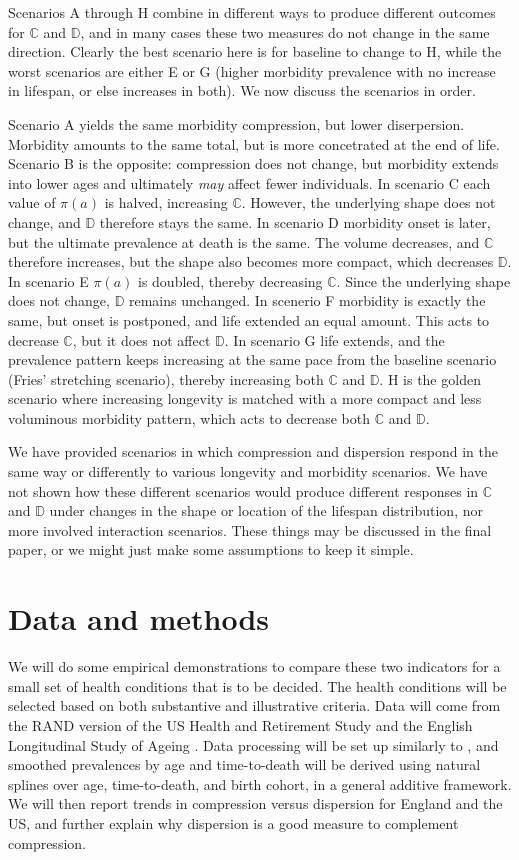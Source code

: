\documentclass{article}
\begin{document}
Scenarios A through H combine in different ways to produce different outcomes
for $\mathbb{C}$ and $\mathbb{D}$, and in many cases these two measures do not
change in the same direction. Clearly the best scenario here is for baseline to change to
H, while the worst scenarios are either E or G (higher morbidity prevalence
with no increase in lifespan, or else increases in both). We now discuss the
scenarios in order.

Scenario A yields the same morbidity compression, but lower diserpersion.
Morbidity amounts to the same total, but is more concetrated at the end of life.
Scenario B is the opposite: compression does not change, but morbidity extends
into lower ages and ultimately \textit{may} affect fewer individuals. In
scenario C each value of $\pi(a)$ is halved, increasing
$\mathbb{C}$. However, the underlying shape does not change, and $\mathbb{D}$
therefore stays the same. In scenario D morbidity onset is later, but the
ultimate prevalence at death is the same. The volume decreases, and $\mathbb{C}$
therefore increases, but the shape also becomes more compact, which decreases
$\mathbb{D}$. In scenario E $\pi(a)$ is doubled, thereby decreasing $\mathbb{C}$.
Since the underlying shape does not change, $\mathbb{D}$ remains unchanged. In
scenerio F morbidity is exactly the same, but onset is postponed, and life
extended an equal amount. This acts to decrease $\mathbb{C}$, but it does not
affect $\mathbb{D}$. In scenario G life extends, and the prevalence pattern
keeps increasing at the same pace from the baseline scenario (Fries' stretching
scenario), thereby increasing both $\mathbb{C}$ and $\mathbb{D}$. H is the
golden scenario where increasing longevity is matched with a more compact and
less voluminous morbidity pattern, which acts to decrease both $\mathbb{C}$ and
$\mathbb{D}$.

We have provided scenarios in which compression and dispersion respond
in the same way or differently to various longevity and morbidity scenarios. We
have not shown how these different scenarios would produce different
responses in $\mathbb{C}$ and $\mathbb{D}$ under changes in the
shape or location of the lifespan distribution, nor more involved
interaction scenarios. These things may be discussed in the final paper, or we
might just make some assumptions to keep it simple.
\FloatBarrier
\section*{Data and methods}
We will do some empirical demonstrations to compare these two indicators for a
small set of health conditions that is to be decided. The health conditions will
be selected based on both substantive and illustrative criteria. Data will come
from the RAND version of the US Health and Retirement Study \citep{HRS} and
the English Longitudinal Study of Ageing \citep{steptoe2012cohort}. Data
processing will be set up similarly to \citet{riffe2015ttd}, and smoothed
prevalences by age and time-to-death will be derived using natural splines
over age, time-to-death, and birth cohort, in a general additive framework. We
will then report trends in compression versus dispersion for England and the US,
and further explain why dispersion is a good measure to complement compression.


    
\end{document}
